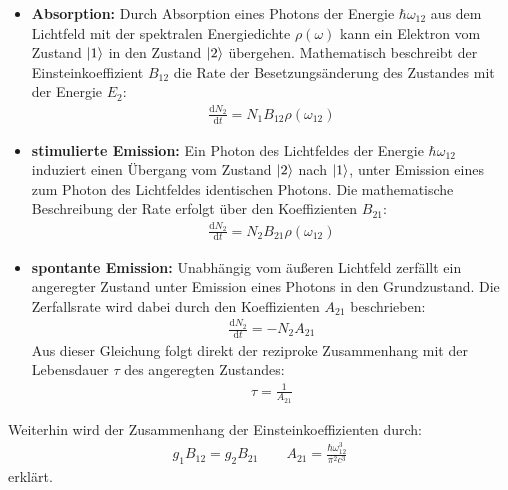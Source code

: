 \documentclass[11pt, a4paper]{article}
\numberwithin{equation}{section}
\begin{document}
\begin{itemize}
	\item \textbf{Absorption:} Durch Absorption eines Photons der Energie $\hbar \omega_{12}$ aus dem Lichtfeld mit der spektralen Energiedichte $\rho(\omega)$ kann ein Elektron vom Zustand $\ket{1}$ in den Zustand $\ket{2}$ übergehen.
	Mathematisch beschreibt der Einsteinkoeffizient $B_{12}$ die Rate der Besetzungsänderung des Zustandes mit der Energie $E_2$:
	\begin{align}
		\frac{\mathrm{d} N_2}{\mathrm{d} t} = N_1 B_{12} \rho\left( \omega_{12} \right)
	\end{align}
	
	\item \textbf{stimulierte Emission:} Ein Photon des Lichtfeldes der Energie $\hbar \omega_{12}$ induziert einen Übergang vom Zustand $\ket{2}$ nach $\ket{1}$, unter Emission eines zum Photon des Lichtfeldes identischen Photons.
	Die mathematische Beschreibung der Rate erfolgt über den Koeffizienten $B_{21}$:
	\begin{align}
		\frac{\mathrm{d} N_2}{\mathrm{d} t} = N_2 B_{21} \rho\left( \omega_{12} \right)
	\end{align}
	
	\item \textbf{spontante Emission:}
	Unabhängig vom äußeren Lichtfeld zerfällt ein angeregter Zustand unter Emission eines Photons in den Grundzustand.
	Die Zerfallsrate wird dabei durch den Koeffizienten $A_{21}$ beschrieben:
	\begin{align}
		\frac{\mathrm{d} N_2}{\mathrm{d} t} = - N_2 A_{21}
	\end{align}
	Aus dieser Gleichung folgt direkt der reziproke Zusammenhang mit der Lebensdauer $\tau$ des angeregten Zustandes:
	\begin{align}
		\tau = \frac{1}{A_{21}}
	\end{align}
\end{itemize}
Weiterhin wird der Zusammenhang der Einsteinkoeffizienten durch:
\begin{align}
	g_1 B_{12} = g_2 B_{21}  \qquad A_{21} = \frac{\hbar \omega_{12}^3}{\pi^2 c^3}
\end{align}
erklärt.
\end{document}
